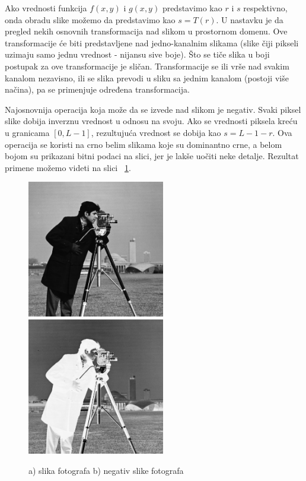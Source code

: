\documentclass[a4paper,12pt,titlepage]{article}
\begin{document}
Ako vrednosti funkcija $f(x, y)$ i $g(x, y)$ predstavimo kao $r$ i $s$ respektivno, onda obradu slike možemo da predstavimo kao $s = T(r)$. U nastavku je da pregled nekih osnovnih transformacija nad slikom u prostornom domenu. Ove transformacije će biti predstavljene nad jedno-kanalnim slikama (slike čiji pikseli uzimaju samo jednu vrednost - nijansu sive boje). Što se tiče slika u boji postupak za ove transformacije je sličan. Transformacije se ili vrše nad svakim kanalom nezavisno, ili se slika prevodi u sliku sa jednim kanalom (postoji više načina), pa se primenjuje određena transformacija.

Najosnovnija operacija koja može da se izvede nad slikom je negativ. Svaki piksel slike dobija inverznu vrednost u odnosu na svoju. Ako se vrednosti piksela kreću u granicama $[0, L - 1]$, rezultujuća vrednost se dobija kao $s = L - 1 - r$. Ova operacija se koristi na crno belim slikama koje su dominantno crne, a belom bojom su prikazani bitni podaci na slici, jer je lakše uočiti neke detalje. Rezultat primene možemo videti na slici ~\ref{negativ}. 

\begin{figure}[ht!]
\centering
\includegraphics[width=60mm]{img/img.png}
\includegraphics[width=60mm]{img/imgNegative.png}
\caption{a) slika fotografa b) negativ slike fotografa}
\label{negativ}
\end{figure}
\end{document}
